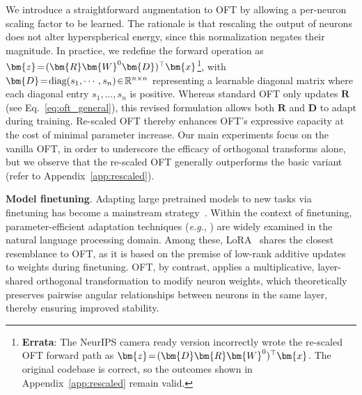 We introduce a straightforward augmentation to OFT by allowing a per-neuron scaling factor to be learned. The rationale is that rescaling the output of neurons does not alter hyperspherical energy, since this normalization negates their magnitude. In practice, we redefine the forward operation as $\thickmuskip=2mu \medmuskip=2mu\bm{z}=(\bm{R}\bm{W}^0\bm{D})^\top\bm{x}$\footnote{\textbf{Errata}: The NeurIPS camera ready version incorrectly wrote the re-scaled OFT forward path as $\thickmuskip=2mu \medmuskip=2mu\bm{z}=(\bm{D}\bm{R}\bm{W}^0)^\top\bm{x}$. The original codebase is correct, so the outcomes shown in Appendix~\ref{app:rescaled} remain valid.}, with $\thickmuskip=2mu \medmuskip=2mu \bm{D}=\text{diag}(s_1,\cdots,s_n)\in\mathbb{R}^{n\times n}$ representing a learnable diagonal matrix where each diagonal entry $s_1,\ldots,s_n$ is positive. Whereas standard OFT only updates $\bm{R}$ (see Eq.~\eqref{eq:oft_general}), this revised formulation allows both $\bm{R}$ and $\bm{D}$ to adapt during training. Re-scaled OFT thereby enhances OFT's expressive capacity at the cost of minimal parameter increase. Our main experiments focus on the vanilla OFT, in order to underscore the efficacy of orthogonal transforms alone, but we observe that the re-scaled OFT generally outperforms the basic variant (refer to Appendix~\ref{app:rescaled}).

\textbf{Model finetuning}. Adapting large pretrained models to new tasks via finetuning has become a mainstream strategy~\cite{devlin2018bert,brown2020language,he2022masked}. Within the context of finetuning, parameter-efficient adaptation techniques (\emph{e.g.}, \cite{hulora2022,houlsby2019parameter,pfeiffer2020adapterfusion}) are widely examined in the natural language processing domain. Among these, LoRA~\cite{hulora2022} shares the closest resemblance to OFT, as it is based on the premise of low-rank additive updates to weights during finetuning. OFT, by contrast, applies a multiplicative, layer-shared orthogonal transformation to modify neuron weights, which theoretically preserves pairwise angular relationships between neurons in the same layer, thereby ensuring improved stability.